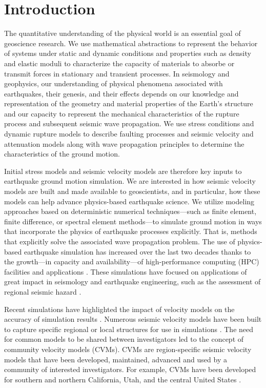 
\section{Introduction}
\label{sec:introduction}

The quantitative understanding of the physical world is an essential goal of geoscience research. We use mathematical abstractions to represent the behavior of systems under static and dynamic conditions and properties such as density and elastic moduli to characterize the capacity of materials to absorbe or transmit forces in stationary and transient processes. In seismology and geophysics, our understanding of physical phenomena associated with earthquakes, their genesis, and their effects depends on our knowledge and representation of the geometry and material properties of the Earth's structure and our capacity to represent the mechanical characteristics of the rupture process and subsequent seismic wave propagation. We use stress conditions and dynamic rupture models to describe faulting processes and seismic velocity and attenuation models along with wave propagation principles to determine the characteristics of the ground motion.

Initial stress models and seismic velocity models are therefore key inputs to earthquake ground motion simulation. We are interested in how seismic velocity models are built and made available to geoscientists, and in particular, how these models can help advance physics-based earthquake science. We utilize modeling approaches based on deterministic numerical techniques---such as finite element, finite difference, or spectral element methods---to simulate ground motion in ways that incorporate the physics of earthquake processes explicitly. That is, methods that explicitly solve the associated wave propagation problem. The use of physics-based earthquake simulation has increased over the last two decades thanks to the growth---in capacity and availability---of high-performance computing (HPC) facilities and applications \citep[e.g.,][]{Aagaard_2008_BSSA2, Olsen_2009_GRL, Bielak_2010_GJI, Cui_2010_Proc}. These simulations have focused on applications of great impact in seismology and earthquake engineering, such as the assessment of regional seismic hazard \citep[e.g.,][]{Graves_2011_PAG}.

Recent simulations have highlighted the impact of velocity models on the accuracy of simulation results \citep[e.g.,][]{Taborda_2014_BSSA}. Numerous seismic velocity models have been built to capture specific regional or local structures for use in simulations \citep[e.g.,][]{Frankel_1992_BSSA, Brocher_2008_BSSA, Graves_2008_BSSA}. The need for common models to be shared between investigators led to the concept of community velocity models (CVMs). CVMs are region-specific seismic velocity models that have been developed, maintained, advanced and used by a community of interested investigators. For example, CVMs have been developed for southern and northern California, Utah, and the central United States \citep[e.g.,][]{Kohler_2003_BSSA, Suss_2003_JGR, Brocher_2006_Proc, Magistrale_2006_Tech, Plesch_2011_SCEC, RamirezGuzman_2012_BSSA}.

